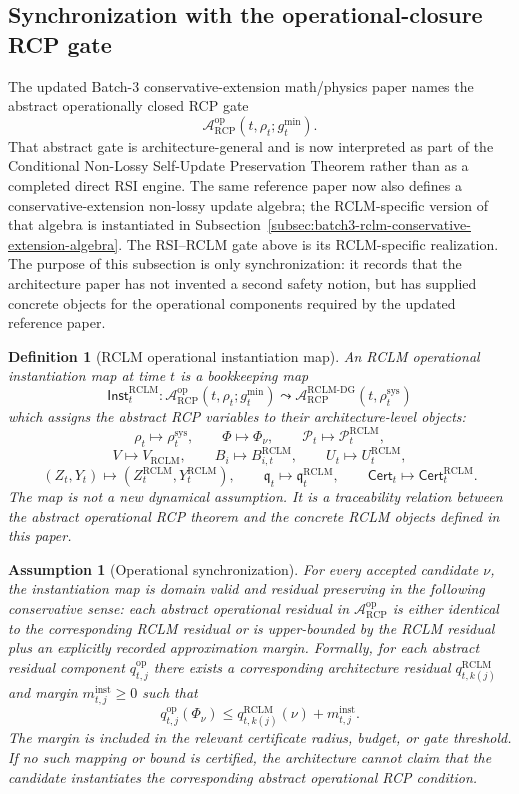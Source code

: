 \documentclass[11pt,a4paper]{article}
\newtheorem{definition}[theorem]{Definition}
\newtheorem{assumption}[theorem]{Assumption}
\newcommand{\Pcal}{\mathcal P}
\newcommand{\Acal}{\mathcal A}
\newcommand{\RCP}{\mathrm{RCP}}
\newcommand{\RCLM}{\mathrm{RCLM}}
\newcommand{\DG}{\mathrm{DG}}
\newcommand{\sys}{\mathrm{sys}}
\begin{document}
\subsection{Synchronization with the operational-closure RCP gate}
\label{subsec:op-rcp-synchronization}

The updated Batch-3 conservative-extension math/physics paper names the abstract operationally closed RCP gate
\[
\Acal_{\RCP}^{\mathrm{op}}(t,\rho_t;g_t^{\min}).
\]
That abstract gate is architecture-general and is now interpreted as part of the Conditional Non-Lossy Self-Update Preservation Theorem rather than as a completed direct RSI engine.  The same reference paper now also defines a conservative-extension non-lossy update algebra; the RCLM-specific version of that algebra is instantiated in Subsection~\ref{subsec:batch3-rclm-conservative-extension-algebra}.  The RSI--RCLM gate above is its RCLM-specific realization.  The purpose of this subsection is only synchronization: it records that the architecture paper has not invented a second safety notion, but has supplied concrete objects for the operational components required by the updated reference paper.

\begin{definition}[RCLM operational instantiation map]
\label{def:rclm-operational-instantiation-map}
An RCLM operational instantiation map at time \(t\) is a bookkeeping map
\[
\mathsf{Inst}_t^{\RCLM}:\Acal_{\RCP}^{\mathrm{op}}(t,\rho_t;g_t^{\min})\leadsto
\Acal_{\RCP}^{\RCLM\text{-}\DG}(t,\rho_t^{\sys})
\]
which assigns the abstract RCP variables to their architecture-level objects:
\[
\rho_t\mapsto \rho_t^{\sys},\qquad
\Phi\mapsto \Phi_\nu,
\qquad
\Pcal_t\mapsto \Pcal_t^{\RCLM},
\]
\[
V\mapsto V_{\RCLM},
\qquad
B_i\mapsto B_{i,t}^{\RCLM},
\qquad
U_t\mapsto U_t^{\RCLM},
\]
\[
(Z_t,Y_t)\mapsto (Z_t^{\RCLM},Y_t^{\RCLM}),
\qquad
\mathfrak q_t\mapsto \mathfrak q_t^{\RCLM},
\qquad
\mathsf{Cert}_t\mapsto \mathsf{Cert}_t^{\RCLM}.
\]
The map is not a new dynamical assumption.  It is a traceability relation between the abstract operational RCP theorem and the concrete RCLM objects defined in this paper.
\end{definition}

\begin{assumption}[Operational synchronization]
\label{ass:rclm-operational-synchronization}
For every accepted candidate \(\nu\), the instantiation map is domain valid and residual preserving in the following conservative sense: each abstract operational residual in \(\Acal_{\RCP}^{\mathrm{op}}\) is either identical to the corresponding RCLM residual or is upper-bounded by the RCLM residual plus an explicitly recorded approximation margin.  Formally, for each abstract residual component \(q_{t,j}^{\mathrm{op}}\) there exists a corresponding architecture residual \(q_{t,k(j)}^{\RCLM}\) and margin \(m_{t,j}^{\mathrm{inst}}\ge0\) such that
\[
q_{t,j}^{\mathrm{op}}(\Phi_\nu)
\le
q_{t,k(j)}^{\RCLM}(\nu)+m_{t,j}^{\mathrm{inst}}.
\]
The margin is included in the relevant certificate radius, budget, or gate threshold.  If no such mapping or bound is certified, the architecture cannot claim that the candidate instantiates the corresponding abstract operational RCP condition.
\end{assumption}
\end{document}
